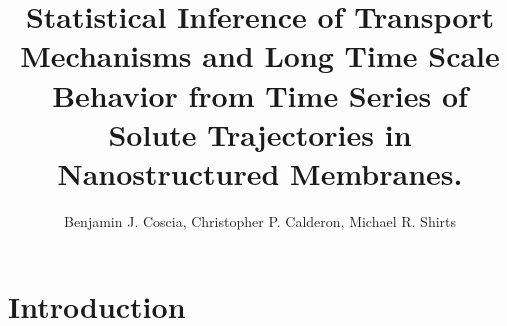 \documentclass{article}
\title{Statistical Inference of Transport Mechanisms and Long Time Scale Behavior from Time Series 
       of Solute Trajectories in Nanostructured Membranes.}
\author{Benjamin J. Coscia, Christopher P. Calderon, Michael R. Shirts}
\begin{document}
  \graphicspath{{./figures/}}
  \maketitle
  

  \section{Introduction}
  
%
%
\end{document}
